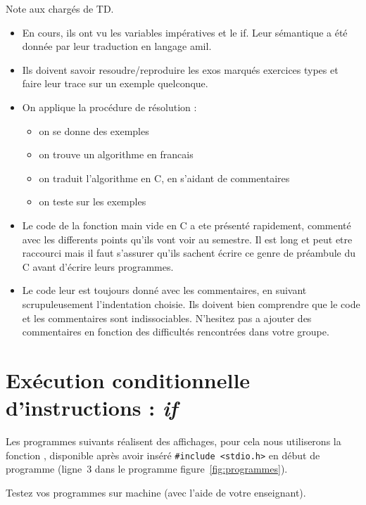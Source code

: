 \begin{correction}
  Note aux chargés de TD.
  \begin{itemize}
  \item En cours, ils ont vu les variables impératives et
    le if. Leur sémantique a été donnée par leur traduction en langage
    amil.
  \item Ils doivent savoir resoudre/reproduire les exos marqués exercices types et faire leur trace sur un exemple quelconque.
  \item On applique la procédure de résolution :
    \begin{itemize}
    \item on se donne des exemples
    \item on trouve un algorithme en francais
    \item on traduit l'algorithme en C, en s'aidant de commentaires
    \item on teste sur les exemples 
    \end{itemize}
  \item Le code de la fonction main vide en C a ete présenté rapidement, commenté avec les differents points qu'ils vont voir au semestre. Il est long et peut etre raccourci mais il faut s'assurer qu'ils sachent écrire ce genre de préambule du C avant d'écrire leurs programmes.
  \item Le code leur est toujours donné avec les commentaires, en suivant scrupuleusement l'indentation choisie. Ils doivent bien comprendre que le code et les commentaires sont indissociables. N'hesitez pas a ajouter des commentaires en fonction des difficultés rencontrées dans votre groupe.
  \end{itemize}
\end{correction}


\section{Exécution conditionnelle d'instructions :  \emph{if}}
Les programmes suivants réalisent des affichages, pour cela nous
utiliserons la fonction , disponible après avoir inséré
\verb|#include <stdio.h>| en début de programme (ligne~3 dans le
programme figure~\ref{fig:programmes}). 

Testez vos programmes sur
machine (avec l'aide de votre enseignant).

